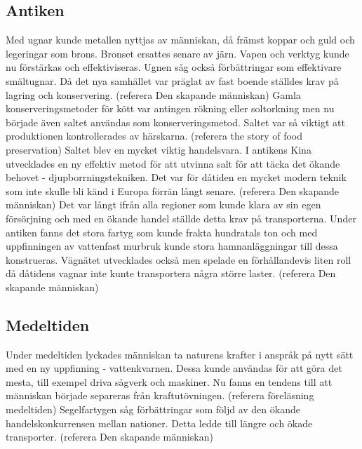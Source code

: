\subsection{Antiken}
Med ugnar kunde metallen nyttjas av människan, då främst koppar och guld och legeringar som brons. Bronset ersattes senare av järn. Vapen och verktyg kunde nu förstärkas och effektiviseras. Ugnen såg också förbättringar som effektivare smältugnar.  
\newline
\newline 
Då det nya samhället var präglat av fast boende ställdes krav på lagring och konservering. (referera Den skapande människan) 
\newline
\newline
Gamla konserveringsmetoder för kött var antingen rökning eller soltorkning men nu började även saltet användas som konserveringsmetod. Saltet var så viktigt att produktionen kontrollerades av härskarna. 
(referera the story of food preservation) 
\newline
\newline
Saltet blev en mycket viktig handelsvara. I antikens Kina utvecklades en ny effektiv metod för att utvinna salt för att täcka det ökande behovet - djupborrningstekniken. Det var för dåtiden en mycket modern teknik som inte skulle bli känd i Europa förrän långt senare. (referera Den skapande människan)
\newline
\newline
Det var långt ifrån alla regioner som kunde klara av sin egen försörjning och med en ökande handel ställde detta krav på transporterna. Under antiken fanns det stora fartyg som kunde frakta hundratals ton och med uppfinningen av vattenfast murbruk kunde stora hamnanläggningar till dessa konstrueras. Vägnätet utvecklades också men spelade en förhållandevis liten roll då dåtidens vagnar inte kunte transportera några större laster. (referera Den skapande människan)

\subsection{Medeltiden}    
Under medeltiden lyckades människan ta naturens krafter i anspråk på nytt sätt med en ny uppfinning - vattenkvarnen. Dessa kunde användas för att göra det mesta, till exempel driva sågverk och maskiner. Nu fanns en tendens till att människan började separeras från kraftutövningen. (referera föreläsning medeltiden) 
\newline
\newline
Segelfartygen såg förbättringar som följd av den ökande handelskonkurrensen mellan nationer. Detta ledde till längre och ökade transporter. (referera Den skapande människan)

